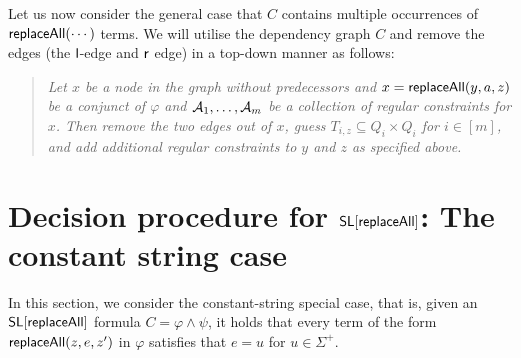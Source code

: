 Let us now consider the general case that $C$ contains multiple occurrences of $\mathsf{replaceAll}(\cdots)$ terms.  We will utilise the dependency graph $C$ and remove the edges (the $\mathsf{l}$-edge and $\mathsf{r}$ edge) in a top-down manner as follows: 
\begin{quote}
\it Let $x$ be a node in the graph without predecessors and $x = \mathsf{replaceAll}(y, a, z)$ be a conjunct of $\varphi$ and $\mathcal{A}_1, \dots, \mathcal{A}_m$ be a collection of regular constraints for $x$. Then remove the two edges out of $x$, guess $T_{i, z} \subseteq Q_i \times Q_i$ for $i \in [m]$, and add additional regular constraints to $y$ and $z$ as specified above. 
\end{quote}




\begin{example}
\end{example}



\section{Decision procedure for $\mathsf{SL}[\mathsf{replaceAll}]$: The constant string case}

In this section, we consider the constant-string special case, that is, given an $\mathsf{SL}[\mathsf{replaceAll}]$ formula $C = \varphi \wedge \psi$, it holds that every term of the form $\mathsf{replaceAll}(z, e, z')$ in $\varphi$ satisfies that $e=u$ for $u \in \Sigma^+$.

